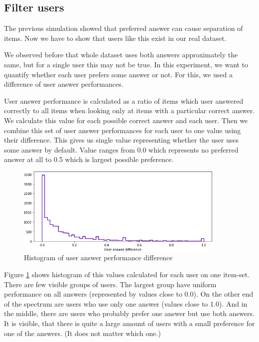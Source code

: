 \documentclass[
  digital, %
  table,   %
  nolof,     %
  nolot,     %
  nocover,
  color,
  final, %
]{fithesis3}
\begin{document}

\subsection{Filter users}\label{filter-users}


The previous simulation showed that preferred answer can cause separation of items. Now we have to show that users like this exist in our real dataset.

We observed before that whole dataset uses both answers approximately the same, but for a single user this may not be true. In this experiment, we want to quantify whether each user prefers some answer or not. For this, we used a difference of user answer performances.

User answer performance is calculated as a ratio of items which user answered correctly to all items when looking only at items with a particular correct answer. We calculate this value for each possible correct answer and each user. Then we combine this set of user answer performances for each user to one value using their difference. This gives us single value representing whether the user uses some answer by default. Value ranges from 0.0 which represents no preferred answer at all to 0.5 which is largest possible preference.

\begin{figure}
  \includegraphics[width=10cm]{img/uneven_answers_hist}
  \caption{Histogram of user answer performance difference}
  \label{fig:uneven_answers_hist}
\end{figure}

Figure \ref{fig:uneven_answers_hist} shows histogram of this values calculated for each user on one item-set. There are few visible groups of users. The largest group have uniform performance on all answers (represented by values close to 0.0). On the other end of the spectrum are users who use only one answer (values close to 1.0). And in the middle, there are users who probably prefer one answer but use both answers. It is visible, that there is quite a large amount of users with a small preference for one of the answers. (It does not matter which one.)
\end{document}
